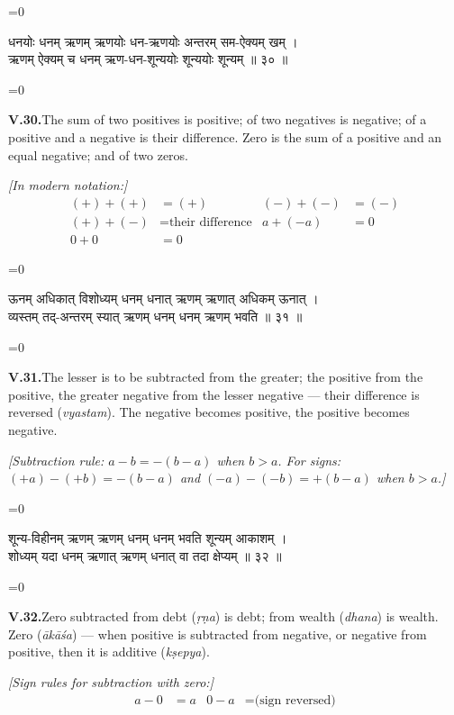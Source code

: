 \documentclass[11pt,a4paper]{article}
\newcommand{\dev}[1]{{\devanagarifont\color{sktcolor}#1}}
\newcommand{\iast}[1]{\textit{#1}}
\newenvironment{paracol}[1]{\begingroup}{\endgroup}
\newcommand{\switchcolumn}[1][]{%
  \ifnum#1=0\relax\else\par\nobreak\vspace{0.5em}\par\nobreak\fi%
}
\begin{document}
\begin{paracol}{2}
\switchcolumn[0]
\dev{%
धनयोः धनम् ऋणम् ऋणयोः धन-ऋणयोः अन्तरम् सम-ऐक्यम् खम् ।\\
ऋणम् ऐक्यम् च धनम् ऋण-धन-शून्ययोः शून्ययोः शून्यम् ॥ ३० ॥
}

\switchcolumn[1]
\textbf{V.30.}\quad The sum of two positives is positive; of two
negatives is negative; of a positive and a negative is their
difference. Zero is the sum of a positive and an equal negative;
and of two zeros.

\medskip
\textit{[In modern notation:]}
\begin{align*}
(+) + (+) &= (+) & (-) + (-) &= (-)\\
(+) + (-) &= \text{their difference} & a + (-a) &= 0\\
0 + 0 &= 0
\end{align*}
\end{paracol}

\vspace{0.3cm}

\begin{paracol}{2}
\switchcolumn[0]
\dev{%
ऊनम् अधिकात् विशोध्यम् धनम् धनात् ऋणम् ऋणात् अधिकम् ऊनात् ।\\
व्यस्तम् तद्-अन्तरम् स्यात् ऋणम् धनम् धनम् ऋणम् भवति ॥ ३१ ॥
}

\switchcolumn[1]
\textbf{V.31.}\quad The lesser is to be subtracted from the greater;
the positive from the positive, the greater negative from the lesser
negative — their difference is reversed (\iast{vyastam}). The
negative becomes positive, the positive becomes negative.

\medskip
\textit{[Subtraction rule: $a - b = -(b - a)$ when $b > a$. For
signs: $(+a) - (+b) = -(b-a)$ and $(-a) - (-b) = +(b-a)$ when
$b > a$.]}
\end{paracol}

\vspace{0.3cm}

\begin{paracol}{2}
\switchcolumn[0]
\dev{%
शून्य-विहीनम् ऋणम् ऋणम् धनम् धनम् भवति शून्यम् आकाशम् ।\\
शोध्यम् यदा धनम् ऋणात् ऋणम् धनात् वा तदा क्षेप्यम् ॥ ३२ ॥
}

\switchcolumn[1]
\textbf{V.32.}\quad Zero subtracted from debt (\iast{ṛṇa}) is debt;
from wealth (\iast{dhana}) is wealth. Zero (\iast{ākāśa}) — when
positive is subtracted from negative, or negative from positive,
then it is additive (\iast{kṣepya}).

\medskip
\textit{[Sign rules for subtraction with zero:]}
\begin{align*}
a - 0 &= a & 0 - a &= \text{(sign reversed)}
\end{align*}
\end{paracol}
\end{document}
